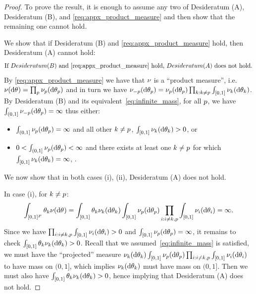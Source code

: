 \begin{proof}

To prove the result, it is enough to assume any two of Desideratum (A), Desideratum (B), and \cref{req:appx_product_measure} and then show that the remaining one cannot hold. 

We show that if Desideratum (B) and \cref{req:appx_product_measure} hold, then Desideratum (A) cannot hold:
\[
	\text{If }Desideratum (B) \text{ and } \Cref{req:appx_product_measure} \text{ hold, } Desideratum (A) \text{ does not hold}.
\]
By \cref{req:appx_product_measure} we have that $\nu$ is a ``product measure'', i.e. $\levync(\de\vecvariantfreq{})=\prod_{\popidx} \levync_{\popidx}(\de\variantfreqperpop{\popidx})$ and in turn we have $\nu_{-p} (\mathrm{d} \theta_{p}) = \nu_{p}(\mathrm{d}\theta_{p}) \prod_{k: k\ne p} \int_{[0,1]}\nu_{k}(\mathrm{d}\theta_{k})$. By Desideratum (B) and its equivalent~\cref{eq:infinite_mass}, for all $p$, we have $\int_{(0,1]} \nu_{-p} (\mathrm{d} \theta_{p})=\infty$ thus either:
\begin{itemize}
	\item[(i)] $\int_{(0,1]}\nu_{p}(\mathrm{d}\theta_{p})=\infty$ and all other $k\ne p$, $\int_{[0,1]}\nu_{k}(\mathrm{d}\theta_{k})>0$, or 
	\item[(ii)] $0<\int_{(0,1]}\nu_{p}(\mathrm{d}\theta_{p})<\infty$ and there exists at least one $k\ne p$ for which $\int_{[0,1]}\nu_{k}(\mathrm{d}\theta_{k})=\infty$, .
\end{itemize}
We now show that in both cases (i), (ii),  Desideratum (A) does not hold.

In case (i), for $k\ne p$:
\[
	\int_{[0,1]^{\numpops}}\variantfreqperpop{k}\levync(\de\vecvariantfreq{}) = \int_{[0,1]}\variantfreqperpop{k} \levync_{k}(\de\variantfreqperpop{k}) \int_{[0,1]} \levync_{\popidx}(\de\variantfreqperpop{\popidx})\prod_{i: i\ne k, \popidx} \int_{[0,1]}\levync_{i}(\de\variantfreqperpop{i})=\infty.
\]
Since we have $\prod_{i: i\ne k, p} \int_{[0,1]}\nu_{i}(\mathrm{d}\theta_{i})>0$ and $\int_{[0,1]}\nu_{p}(\mathrm{d}\theta_{p})=\infty$, it remains to check $\int_{[0,1]} \theta_{k} \nu_{k}(\mathrm{d}\theta_{k})>0$. 
Recall that we assumed~\cref{eq:infinite_mass} is satisfied, we must have the ``projected'' measure $\nu_{k}(\mathrm{d}\theta_{k}) \int_{[0,1]} \nu_{p}(\mathrm{d}\theta_{p})\prod_{i: i\ne k, p} \int_{[0,1]}\nu_{i}(\mathrm{d}\theta_{i})$ to have mass on $(0,1]$, which implies $\nu_{k}(\mathrm{d}\theta_{k})$ must have mass on $(0,1]$. Then we must also have $\int_{[0,1]}\theta_{k} \nu_{k}(\mathrm{d}\theta_{k})>0$, hence implying that Desideratum (A) does not hold.


\end{proof}
